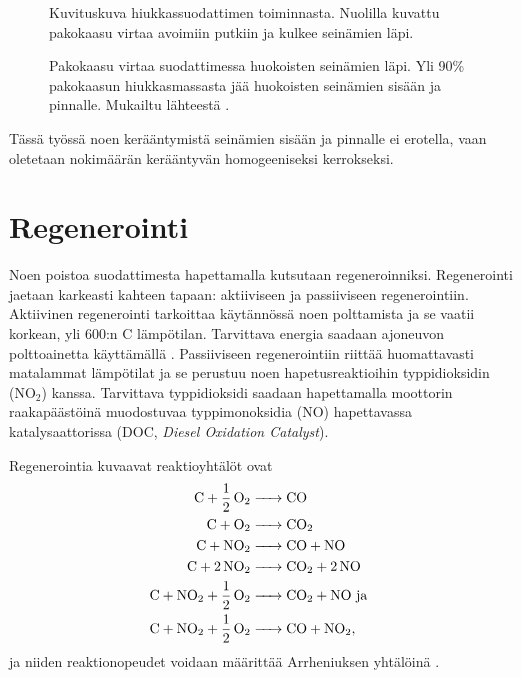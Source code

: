 \begin{figure}[H]
    \centering 
               {Kuvituskuva hiukkassuodattimen toiminnasta. Nuolilla kuvattu pakokaasu virtaa avoimiin putkiin ja kulkee seinämien läpi.}
    \caption{Pakokaasu virtaa suodattimessa huokoisten seinämien läpi. Yli 90\% pakokaasun hiukkasmassasta jää huokoisten seinämien sisään ja pinnalle. Mukailtu lähteestä \cite{dieselnet_dpf}.}
    \label{fig:wall-flow-dpf}
\end{figure}

Tässä työssä noen kerääntymistä seinämien sisään ja pinnalle ei erotella, vaan oletetaan nokimäärän kerääntyvän homogeeniseksi kerrokseksi.


\section{Regenerointi}
Noen poistoa suodattimesta hapettamalla kutsutaan regeneroinniksi. Regenerointi jaetaan karkeasti kahteen tapaan: aktiiviseen ja passiiviseen regenerointiin. 
Aktiivinen regenerointi tarkoittaa käytännössä noen polttamista ja se
vaatii korkean, yli 600:n \degree C lämpötilan. Tarvittava energia saadaan ajoneuvon polttoainetta käyttämällä \cite{dieselnet_dpf}. Passiiviseen regenerointiin riittää huomattavasti matalammat lämpötilat ja se perustuu noen hapetusreaktioihin typpidioksidin (NO\(_2\)) kanssa. Tarvittava typpidioksidi saadaan hapettamalla moottorin raakapäästöinä muodostuvaa typpimonoksidia (NO) hapettavassa katalysaattorissa (DOC, \emph{Diesel Oxidation Catalyst}).


Regenerointia kuvaavat reaktioyhtälöt ovat  
\begin{align}
    \ce{C + 1/2 O2 &-> CO }\label{req:regen_c2co}\\
    \ce{C + O2 &-> CO2}\label{req:regen_c2co2}\\
    \ce{C + NO2 &-> CO +  NO}  \\
    \ce{C + 2 NO2 &-> CO2 + 2 NO}  \\
    \ce{C + NO2 + 1/2 O2 &-> CO2 + NO} \text{ ja }\\
    \ce{C + NO2 + 1/2 O2 &-> CO + NO2},
\end{align}
ja niiden reaktionopeudet voidaan määrittää Arrheniuksen yhtälöinä \cite{LiuGuanlin2021Roio}.

